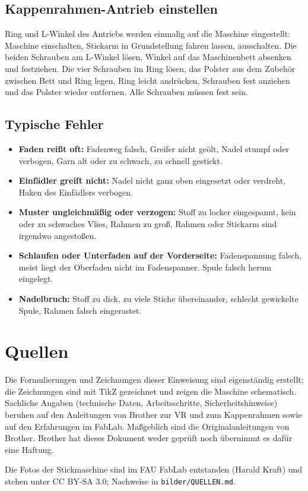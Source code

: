 \documentclass{\basedir/fablab-document}
\begin{document}
	\subsection{Kappenrahmen-Antrieb einstellen}
	Ring und L-Winkel des Antriebs werden einmalig auf die Maschine eingestellt: Maschine einschalten, Stickarm in Grundstellung fahren lassen, ausschalten. Die beiden Schrauben am L-Winkel lösen, Winkel auf das Maschinenbett absenken und festziehen. Die vier Schrauben im Ring lösen, das Polster aus dem Zubehör zwischen Bett und Ring legen, Ring leicht andrücken, Schrauben fest anziehen und das Polster wieder entfernen. Alle Schrauben müssen fest sein.

	\subsection{Typische Fehler}
	\begin{itemize}
		\item \textbf{Faden reißt oft:} Fadenweg falsch, Greifer nicht geölt, Nadel stumpf oder verbogen, Garn alt oder zu schwach, zu schnell gestickt.
		\item \textbf{Einfädler greift nicht:} Nadel nicht ganz oben eingesetzt oder verdreht, Haken des Einfädlers verbogen.
		\item \textbf{Muster ungleichmäßig oder verzogen:} Stoff zu locker eingespannt, kein oder zu schwaches Vlies, Rahmen zu groß, Rahmen oder Stickarm sind irgendwo angestoßen.
		\item \textbf{Schlaufen oder Unterfaden auf der Vorderseite:} Fadenspannung falsch, meist liegt der Oberfaden nicht im Fadenspanner. Spule falsch herum eingelegt.
		\item \textbf{Nadelbruch:} Stoff zu dick, zu viele Stiche übereinander, schlecht gewickelte Spule, Rahmen falsch eingerastet.
	\end{itemize}

	\section{Quellen}
	Die Formulierungen und Zeichnungen dieser Einweisung sind eigenständig erstellt; die Zeichnungen sind mit TikZ gezeichnet und zeigen die Maschine schematisch. Sachliche Angaben (technische Daten, Arbeitsschritte, Sicherheitshinweise) beruhen auf den Anleitungen von Brother zur VR und zum Kappenrahmen sowie auf den Erfahrungen im FabLab. Maßgeblich sind die Originalanleitungen von Brother. Brother hat dieses Dokument weder geprüft noch übernimmt es dafür eine Haftung.

	Die Fotos der Stickmaschine sind im FAU FabLab entstanden (Harald Kraft) und stehen unter CC BY-SA 3.0; Nachweise in \texttt{bilder/QUELLEN.md}.

	\newpage
\end{document}
